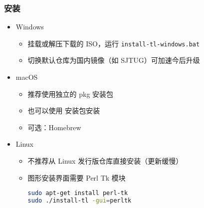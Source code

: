 \begin{frame}[fragile]
  \frametitle{安装}
  \begin{itemize}
    \item Windows
          \begin{itemize}
            \item 挂载或解压下载的 ISO，运行 \verb|install-tl-windows.bat|
            \item 切换默认仓库为国内镜像（如 SJTUG）可加速今后升级
          \end{itemize}
    \item macOS
          \begin{itemize}
            \item 推荐使用独立的 pkg 安装包 
            \item 也可以使用 \TL 安装包安装 
            \item 可选：Homebrew 
          \end{itemize}
    \item Linux
          \begin{itemize}
            \item 不推荐从 Linux 发行版仓库直接安装（更新缓慢）
            \item 图形安装界面需要 Perl Tk 模块
                  \begin{lstlisting}[language=bash]
sudo apt-get install perl-tk
sudo ./install-tl -gui=perltk
        \end{lstlisting}
          \end{itemize}
  \end{itemize}
\end{frame}


